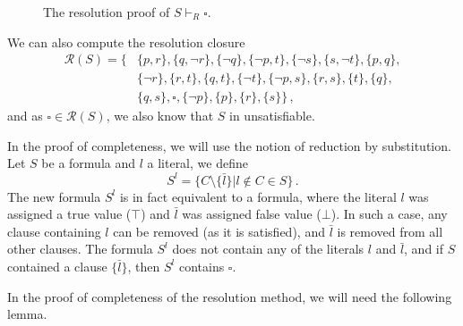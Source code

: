 \begin{figure}
\centering
{}
\caption{The resolution proof of $S \vdash_R \square$.}
\end{figure}

We can also compute the resolution closure 
\begin{align*}
\mathcal{R}(S) =  \{ & \{p, r\}, \{q, \neg r\}, \{\neg q\}, \{\neg p, t\}, \{\neg s\}, \{s, \neg t\}, \{p, q\}, \\ 
& \{\neg r\}, \{r,t\}, \{q,t\}, \{\neg t\}, \{\neg p, s\}, \{r,s\}, \{t\}, \{q\}, \\ 
& \{q,s\}, \square, \{\neg p\}, \{p\}, \{r\}, \{s\}\}\,,
\end{align*}
and as $\square \in \mathcal{R}(S)$, we also know that $S$ in unsatisfiable.

In the proof of completeness, we will use the notion of reduction by substitution. Let $S$ be a formula and $l$ a literal, we define $$S^l = \{C \setminus \{\bar{l}\}| l \notin C \in S\}\,.$$ The new formula $S^l$ is in fact equivalent to a formula, where the literal $l$ was assigned a true value ($\top$) and $\bar{l}$ was assigned false value ($\bot$). In such a case, any clause containing $l$ can be removed (as it is satisfied), and $\bar{l}$ is removed from all other clauses. The formula $S^l$ does not contain any of the literals $l$ and $\bar{l}$, and if $S$ contained a clause $\{\bar{l}\}$, then $S^l$ contains $\square$.

In the proof of completeness of the resolution method, we will need the following lemma.

